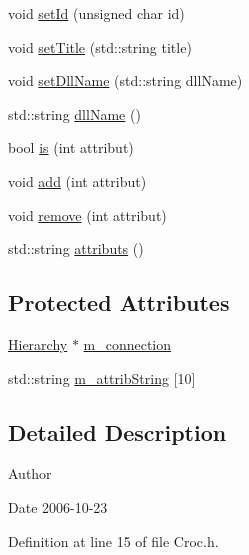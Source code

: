 \begin{DoxyCompactItemize}
\item 
void \hyperlink{classObject_a398fe08cba594a0ce6891d59fe4f159f}{setId} (unsigned char id)
\item 
void \hyperlink{classObject_a89557dbbad5bcaa02652f5d7fa35d20f}{setTitle} (std::string title)
\item 
void \hyperlink{classObject_a870c5af919958c2136623b2d7816d123}{setDllName} (std::string dllName)
\item 
std::string \hyperlink{classObject_a2e3947f2870094c332d7454117f3ec63}{dllName} ()
\item 
bool \hyperlink{classAttrib_a704f26af560909ad22065083bb7d4c34}{is} (int attribut)
\item 
void \hyperlink{classAttrib_a235f773af19c900264a190b00a3b4ad7}{add} (int attribut)
\item 
void \hyperlink{classAttrib_a7d4ef7e32d93cb287792b87b857e79f3}{remove} (int attribut)
\item 
std::string \hyperlink{classAttrib_aee7bbf16b144887f196e1341b24f8a26}{attributs} ()
\end{DoxyCompactItemize}
\subsection*{Protected Attributes}
\begin{DoxyCompactItemize}
\item 
\hyperlink{classHierarchy}{Hierarchy} $\ast$ \hyperlink{classElement_abe3de7a5dbbc9a6dd2d7e012e5fdb266}{m\_\-connection}
\item 
std::string \hyperlink{classAttrib_a3414521d7a82476e874b25a5407b5e63}{m\_\-attribString} \mbox{[}10\mbox{]}
\end{DoxyCompactItemize}


\subsection{Detailed Description}
\begin{DoxyAuthor}{Author}

\end{DoxyAuthor}
\begin{DoxyDate}{Date}
2006-\/10-\/23 
\end{DoxyDate}


Definition at line 15 of file Croc.h.

